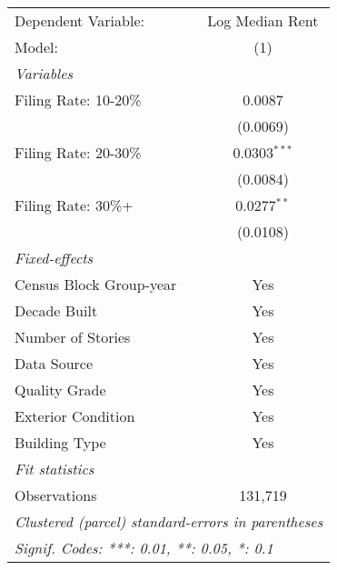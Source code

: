 \begingroup
\centering
\begin{tabular}{lc}
   \tabularnewline \midrule \midrule
   Dependent Variable:     & Log Median Rent\\  
   Model:                  & (1)\\  
   \midrule
   \emph{Variables}\\
   Filing Rate: 10-20\%    & 0.0087\\   
                           & (0.0069)\\   
   Filing Rate: 20-30\%    & 0.0303$^{***}$\\   
                           & (0.0084)\\   
   Filing Rate: 30\%+      & 0.0277$^{**}$\\   
                           & (0.0108)\\   
   \midrule
   \emph{Fixed-effects}\\
   Census Block Group-year & Yes\\  
   Decade Built            & Yes\\  
   Number of Stories       & Yes\\  
   Data Source             & Yes\\  
   Quality Grade           & Yes\\  
   Exterior Condition      & Yes\\  
   Building Type           & Yes\\  
   \midrule
   \emph{Fit statistics}\\
   Observations            & 131,719\\  
   \midrule \midrule
   \multicolumn{2}{l}{\emph{Clustered (parcel) standard-errors in parentheses}}\\
   \multicolumn{2}{l}{\emph{Signif. Codes: ***: 0.01, **: 0.05, *: 0.1}}\\
\end{tabular}
\par\endgroup
